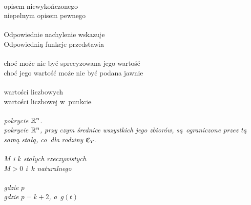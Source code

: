 \documentclass[a4paper,11pt]{article}
\begin{document}
\noindent
{} \\
\Jest  opisem niewykończonego \\
\Powin niepełnym opisem pewnego \\
 \\
\Jest  Odpowiednie nachylenie wskazuje \\
\Powin Odpowiednią funkcje przedstawia \\
 \\
\Jest  choć może nie być sprecyzowana jego wartość \\
\Powin choć jego wartość może nie być podana jawnie \\
 \\
\Jest  wartości liczbowych \\
\Powin wartości liczbowej w~punkcie \\
 \\
\Jest  \textit{pokrycie $\mathbb{R}^{ n }$.} \\
\Powin \textit{pokrycie $\mathbb{R}^{ n }$, przy czym średnice wszystkich jego
  zbiorów, są~ograniczone przez tą samą stałą, co~dla rodziny
  $\mathfrak{C}_{ T }$.} \\
 \\
\Jest  \textit{$M$ i $k$ stałych rzeczywistych} \\
\Powin \textit{$M > 0$ i~$k$ naturalnego} \\
 \\
\Jest  \textit{gdzie $p$} \\
\Powin \textit{gdzie $p = k + 2$, a~$g( t )$} \\


\vspace{\spaceTwo}










\newpage



\end{document}
